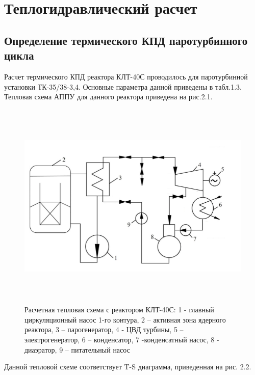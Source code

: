 \chapter{Теплогидравлический расчет}
\section{Определение термического КПД паротурбинного цикла}

Расчет термического КПД реактора КЛТ-40С проводилось для паротурбинной
установки ТК-35/38-3,4. Основные параметра данной  приведены в табл.1.3. Тепловая схема АППУ для данного реактора приведена на рис.2.1.

\begin{figure}[!h]
\center
\includegraphics[width=6.49583in,height=3.95764in]{media/image4.png}
\caption{Расчетная тепловая схема  с реактором КЛТ-40С: 1 -
главный циркуляционный насос 1-го контура, 2 -- активная зона ядерного
реактора, 3 -- парогенератор, 4 - ЦВД турбины, 5 -- электрогенератор, 6
-- конденсатор, 7 -конденсатный насос, 8 - диаэратор, 9 -- питательный
насос}
\end{figure}

Данной тепловой схеме соответствует T-S диаграмма, приведенная на рис.
2.2.

